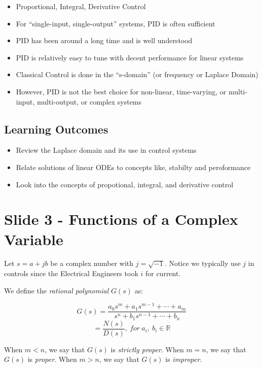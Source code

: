 \documentclass[
  letterpaper,
  DIV=11,
  numbers=noendperiod]{scrreprt}
\providecommand{\tightlist}{%
  \setlength{\itemsep}{0pt}\setlength{\parskip}{0pt}}
\begin{document}
\begin{itemize}
\tightlist
\item
  Proportional, Integral, Derivative Control
\item
  For ``single-input, single-output'' systems, PID is often sufficient
\item
  PID has been around a long time and is well understood
\item
  PID is relatively easy to tune with decent performance for linear
  systems
\item
  Classical Control is done in the ``s-domain'' (or frequency or Laplace
  Domain)
\item
  However, PID is not the best choice for non-linear, time-varying, or
  multi-input, multi-output, or complex systems
\end{itemize}

\subsection{Learning Outcomes}\label{learning-outcomes-1}

\begin{itemize}
\tightlist
\item
  Review the Laplace domain and its use in control systems
\item
  Relate solutions of linear ODEs to concepts like, stabilty and
  peroformance
\item
  Look into the concepts of propotional, integral, and derivative
  control
\end{itemize}

\section{Slide 3 - Functions of a Complex
Variable}\label{slide-3---functions-of-a-complex-variable}

Let \(s=a+jb\) be a complex number with \(j=\sqrt{-1}\). Notice we
typically use \(j\) in controls since the Electrical Engineers took
\(i\) for current.

We define the \emph{rational polynomial} \(G(s)\) as:

\[G(s) = \frac{a_0s^m+ a_1s^{m-1} + \cdots + a_m}{s^n+b_1s^{n-1}+ \cdots + b_n}\]
\[= \frac{N(s)}{D(s)}, \ for \ a_i, \ b_i \in \mathbb{R}\]

When \(m<n\), we say that \(G(s)\) is \emph{strictly proper}. When
\(m=n\), we say that \(G(s)\) is \emph{proper}. When \(m>n\), we say
that \(G(s)\) is \emph{improper}.
\end{document}
